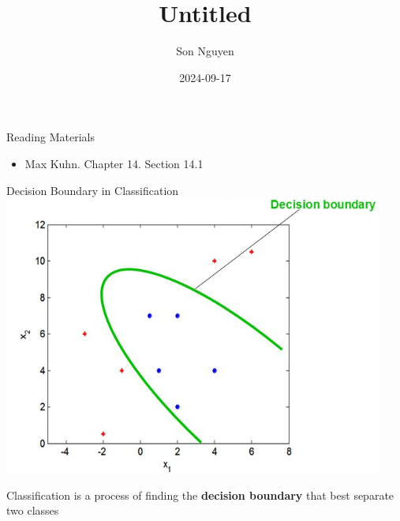 \documentclass[
  ignorenonframetext,
]{beamer}
\title{Untitled}
\author{Son Nguyen}
\date{2024-09-17}
\providecommand{\tightlist}{%
  \setlength{\itemsep}{0pt}\setlength{\parskip}{0pt}}
\begin{document}
\frame{\titlepage}

\begin{frame}{Reading Materials}
\label{reading-materials}
\begin{itemize}
\tightlist
\item
  Max Kuhn. Chapter 14. Section 14.1
\end{itemize}
\end{frame}

\begin{frame}{Decision Boundary in Classification}
\label{decision-boundary-in-classification}
\includegraphics{images/db.png}

Classification is a process of finding the \textbf{decision boundary}
that best separate two classes
\end{frame}
\end{document}
